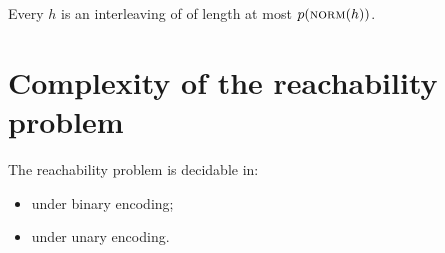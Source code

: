 \documentclass[a4paper,UKenglish,cleveref, autoref, thm-restate,dvipsnames,anonymous]{lipics-v2021}
\begin{document}
\begin{corollary} \label{cor:decomp}
Every \trace $h$ is an interleaving of  of length at most $p(\textsc{norm}(h))$.
\end{corollary}


\section{Complexity of the reachability problem}

\begin{theorem} \label{thm:upper-bound}
The \donevass reachability problem is decidable in:
\begin{itemize} 
    \item \expspace under binary encoding;
    \item \pspace under unary encoding.
\end{itemize}
\end{theorem}
%
\end{document}
